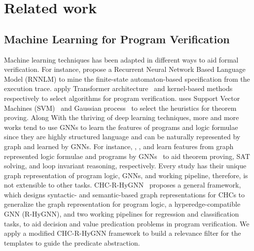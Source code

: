 


\section{Related work}
\subsection{Machine Learning for Program Verification}
Machine learning techniques has been adapted in different ways to aid formal verification. 
%
For instance, \cite{10.1145/3213846.3213876} propose a Recurrent Neural Network Based Language Model (RNNLM) to mine the finite-state automaton-based specification from the execution trace. 
%
\cite{9286080,Richter2020-yh} apply Transformer architecture~\cite{vaswani2017attention} and kernel-based methods~\cite{kernelMethods} respectively to select algorithms for program verification.
%
\cite{heuristicSelectionForTP} uses Support Vector Machines (SVM)~\cite{cortes1995support} and Gaussian process~\cite{10.5555/1162254} to select the heuristics for theorem proving.
%
Along With the thriving of deep learning techniques, more and more works tend to use GNNs to learn the features of programs and logic formulae since they are highly structured language and can be naturally represented by graph and learned by GNNs.
%
For instance, \cite{NIPS2017_6871,DBLP:journals/corr/abs-1905-10006}, \cite{DBLP:journals/corr/abs-1903-04671,DBLP:journals/corr/abs-1802-03685}, and \cite{Si2018LearningLI} learn features from graph represented logic formulae and programs by GNNs~\cite{DBLP:journals/corr/GilmerSRVD17,4700287,li2017gated} to aid theorem proving, SAT solving, and loop invariant reasoning, respectively. 
%
Every study has their unique graph representation of program logic, GNNs, and working pipeline, therefore, is not extensible to other tasks.
%
CHC-R-HyGNN~\cite{tech-report} proposes a general framework, which designs syntactic- and semantic-based graph representations for CHCs to generalize the graph representation for program logic, a hyperedge-compatible GNN (R-HyGNN), and two working pipelines for regression and classification tasks, to aid decision and value predication problems in program verification.
%
We apply a modified CHC-R-HyGNN framework to build a relevance filter for the templates to guide the predicate abstraction. 


